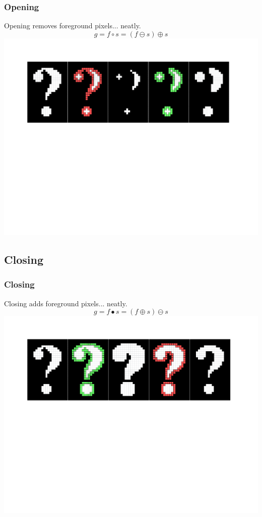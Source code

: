 \documentclass{beamer}
\begin{document}
\begin{frame}
\frametitle{Opening}
\begin{center}
Opening removes foreground pixels... neatly.
\begin{equation*}
g = f \circ s = (f \ominus s) \oplus s
\end{equation*}
\includegraphics[width=1\textwidth,trim={0 0 0 0.5in},clip]{opening}
\end{center}
\end{frame}

\subsection[Closing]{Closing}

\begin{frame}
\frametitle{Closing}
\begin{center}
Closing adds foreground pixels... neatly.
\begin{equation*}
g = f \bullet s = (f \oplus s) \ominus s
\end{equation*}
\includegraphics[width=1\textwidth,trim={0 0 0 0.5in},clip]{closing}
\end{center}
\end{frame}
\end{document}
